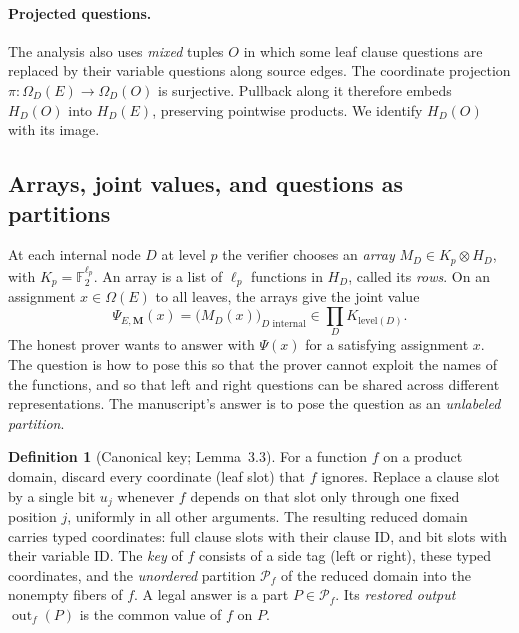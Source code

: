 \documentclass[11pt]{article}
\theoremstyle{definition}
\newtheorem{definition}[theorem]{Definition}
\theoremstyle{remark}
\DeclareMathOperator{\out}{out}
\newcommand{\Fb}{\mathbb F_2}
\begin{document}
\paragraph{Projected questions.} The analysis also uses \emph{mixed} tuples $O$
in which some leaf clause questions are replaced by their variable questions
along source edges. The coordinate projection
$\pi:\Omega_D(E)\to\Omega_D(O)$ is surjective. Pullback along it therefore
embeds $H_D(O)$ into $H_D(E)$, preserving pointwise products. We identify $H_D(O)$ with its image.

\subsection{Arrays, joint values, and questions as partitions}\label{sec:keys}

At each internal node $D$ at level $p$ the verifier chooses an \emph{array}
$M_D\in K_p\otimes H_D$, with $K_p=\Fb^{\ell_p}$. An array is a list of $\ell_p$
functions in $H_D$, called its \emph{rows}. On an assignment $x\in\Omega(E)$
to all leaves, the arrays give the joint value
\[
 \Psi_{E,\mathbf M}(x)=\bigl(M_D(x)\bigr)_{D\text{ internal}}
   \in\prod_D K_{\mathrm{level}(D)}.
\]
The honest prover wants to answer with $\Psi(x)$ for a satisfying assignment
$x$. The question is how to pose this so that the prover cannot exploit the
names of the functions, and so that left and right questions can be shared
across different representations. The manuscript's answer is to pose the
question as an \emph{unlabeled partition}.

\begin{definition}[Canonical key; Lemma~3.3]\label{def:key}
For a function $f$ on a product domain, discard every coordinate (leaf slot)
that $f$ ignores. Replace a clause slot by a single bit $u_j$ whenever $f$
depends on that slot only through one fixed position $j$, uniformly in all
other arguments. The resulting reduced domain carries typed coordinates:
full clause slots with their clause ID, and bit slots with their variable ID.
The \emph{key} of $f$ consists of a side tag (left or right), these typed
coordinates, and the \emph{unordered} partition $\mathcal P_f$ of the reduced
domain into the nonempty fibers of $f$. A legal answer is a part
$P\in\mathcal P_f$. Its \emph{restored output} $\out_f(P)$ is the common value
of $f$ on $P$.
\end{definition}
\end{document}
